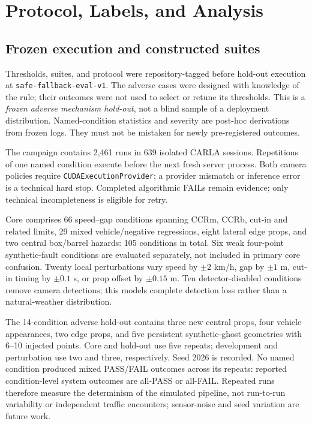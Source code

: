 \documentclass[conference]{IEEEtran}
\begin{document}
\section{Protocol, Labels, and Analysis}
\subsection{Frozen execution and constructed suites}
Thresholds, suites, and protocol were repository-tagged before hold-out
execution at \texttt{safe-fallback-eval-v1}. The adverse cases were designed with
knowledge of the rule; their outcomes were not used to select or retune its
thresholds. This is a \emph{frozen adverse mechanism hold-out}, not a blind sample
of a deployment distribution. Named-condition statistics and severity are
post-hoc derivations from frozen logs. They must not be mistaken for newly
pre-registered outcomes.

The campaign contains 2,461 runs in 639 isolated CARLA sessions. Repetitions of
one named condition execute before the next fresh server process. Both camera
policies require \texttt{CUDAExecutionProvider}; a provider mismatch or inference
error is a technical hard stop. Completed algorithmic FAILs remain evidence;
only technical incompleteness is eligible for retry.

Core comprises 66 speed--gap conditions spanning CCRm, CCRb, cut-in and related
limits, 29 mixed vehicle/negative regressions, eight lateral edge props, and two
central box/barrel hazards: 105 conditions in total. Six weak four-point
synthetic-fault conditions are evaluated separately, not included in primary
core confusion. Twenty local perturbations vary speed by $\pm2$ km/h, gap by
$\pm1$ m, cut-in timing by $\pm0.1$ s, or prop offset by $\pm0.15$ m. Ten
detector-disabled conditions remove camera detections; this models complete
detection loss rather than a natural-weather distribution.

The 14-condition adverse hold-out contains three new central props, four vehicle
appearances, two edge props, and five persistent synthetic-ghost geometries with
6--10 injected points. Core and hold-out use five repeats; development and
perturbation use two and three, respectively. Seed 2026 is recorded. No named
condition produced mixed PASS/FAIL outcomes across its repeats: reported
condition-level system outcomes are all-PASS or all-FAIL. Repeated runs therefore
measure the determinism of the simulated pipeline, not run-to-run variability or
independent traffic encounters; sensor-noise and seed variation are future work.
\end{document}
